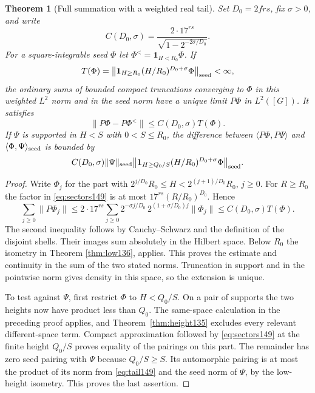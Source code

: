 \documentclass[a4paper,11pt]{article}
\newtheorem{theorem}[proposition]{Theorem}
\theoremstyle{definition}
\theoremstyle{remark}
\numberwithin{equation}{section}
\begin{document}
\begin{theorem}[Full summation with a weighted real tail]
\label{thm:tail149}
Set \(D_0=2frs\), fix \(\sigma>0\), and write
\[
  C(D_0,\sigma)=
        \frac{2\cdot17^{rs}}{\sqrt{1-2^{-2\sigma/D_0}}}.
\]
For a square-integrable seed \(\Phi\) let
\(\Phi^{<}=\mathbf1_{H<R_0}\Phi\). If
\[
   T(\Phi)=\big\|\mathbf1_{H\ge R_0}
               (H/R_0)^{D_0+\sigma}\Phi\big\|_{\rm seed}<\infty ,
\]
the ordinary sums of bounded compact truncations converging
to \(\Phi\) in this weighted \(L^2\) norm and in the seed norm
have a unique limit \(P\Phi\) in \(L^2([G])\). It satisfies
\begin{equation}
       \|P\Phi-P\Phi^{<}\|\le C(D_0,\sigma)T(\Phi).
       \label{eq:tail149}
\end{equation}
If \(\Psi\) is supported in \(H<S\) with \(0<S\le R_0\),
the difference between \(\langle P\Phi,P\Psi\rangle\) and
\(\langle\Phi,\Psi\rangle_{\rm seed}\) is bounded by
\[
 C(D_0,\sigma)\|\Psi\|_{\rm seed}
        \big\|\mathbf1_{H\ge Q_0/S}
              (H/R_0)^{D_0+\sigma}\Phi\big\|_{\rm seed}.
\]
\end{theorem}
\begin{proof}
Write \(\Phi_j\) for the part with
\(2^{j/D_0}R_0\le H<2^{(j+1)/D_0}R_0\), \(j\ge0\).
For \(R\ge R_0\) the factor in \eqref{eq:sectors149} is at
most \(17^{rs}(R/R_0)^{D_0}\). Hence
\[
 \sum_{j\ge0}\|P\Phi_j\|
 \le 2\cdot17^{rs}\sum_{j\ge0}
       2^{-\sigma j/D_0}\,
         2^{(1+\sigma/D_0)j}\|\Phi_j\|
 \le C(D_0,\sigma)T(\Phi).
\]
The second inequality follows by Cauchy--Schwarz and the
definition of the disjoint shells. Their images sum absolutely
in the Hilbert space. Below \(R_0\) the isometry in Theorem \ref{thm:low136}, applies. This proves the estimate and continuity
in the sum of the two stated norms. Truncation in support and
in the pointwise norm gives density in this space, so the
extension is unique.

To test against \(\Psi\), first restrict \(\Phi\) to
\(H<Q_0/S\). On a pair of supports the two heights now have
product less than \(Q_0\). The same-space calculation in
the preceding proof applies, and Theorem~\ref{thm:height135}
excludes every relevant different-space term. Compact
approximation followed by \eqref{eq:sectors149} at the finite
height \(Q_0/S\) proves equality of the pairings on this part.
The remainder has zero seed pairing with \(\Psi\) because
\(Q_0/S\ge S\). Its automorphic pairing is at most the product
of its norm from \eqref{eq:tail149} and the seed norm of
\(\Psi\), by the low-height isometry. This proves the last
assertion.
\end{proof}
\end{document}

